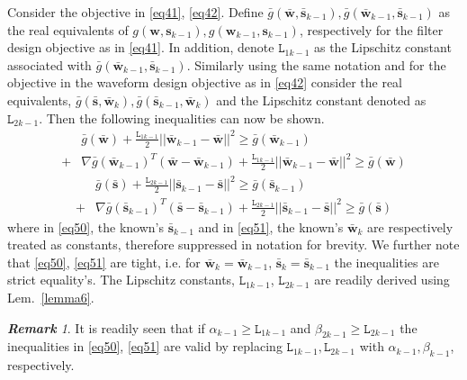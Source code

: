 \documentclass[11pt,draftclsnofoot,onecolumn]{IEEEtran}
\theoremstyle{definition}
\theoremstyle{remark}
\newtheorem{remk}{\bf Remark}
\begin{document}
Consider the objective in \eqref{eq41}, \eqref{eq42}. Define $\bar{g}( \mathbf{\bar{w}},\mathbf{\bar{s}}_{k-1}),\bar{g}(\mathbf{\bar{w}}_{k-1},\mathbf{\bar{s}}_{k-1})$ as the real equivalents of $g( \mathbf{w},\mathbf{s}_{k-1}),g (\mathbf{w}_{k-1},\mathbf{s}_{k-1})$, respectively for the filter design objective as in \eqref{eq41}. In addition, denote  $\mathtt{L}_{1k-1}$ as the Lipschitz constant associated with $\bar{g}(\bar{\mathbf{w}}_{k-1},\mathbf{\bar{s}}_{k-1})$. Similarly using the same notation and for the objective in the waveform design objective  as in \eqref{eq42} consider the real equivalents, $\bar{g}( \mathbf{\bar{s}},\mathbf{\bar{w}}_{k}),\bar{g}(\mathbf{\bar{s}}_{k-1},\mathbf{\bar{w}}_{k})$ and the Lipschitz constant denoted as $\mathtt{L}_{2k-1}$. Then the following inequalities can now be shown.
\begin{equation} \label{eq50}
\begin{aligned} &\bar{g}( \mathbf{\bar{w}})+\frac{\mathtt{L}_{1k-1}}{2}||\mathbf{\bar{w}}_{k-1}-\mathbf{\bar{w}} ||^2
  \geq \bar{g}(\mathbf{\bar{w}}_{k-1}) \\
  +&\nabla \bar{g}(\mathbf{\bar{w}}_{k-1})^T(\mathbf{\bar{w}}-\mathbf{\bar{w}}_{k-1}) 
  +\frac{\mathtt{L}_{1k-1}}{2}||\mathbf{\bar{w}}_{k-1}-\mathbf{\bar{w}}||^2 \geq \bar{g}(\mathbf{\bar{w}}) \end{aligned}
\end{equation}
\begin{equation} \label{eq51}
\begin{aligned} &\bar{g}( \mathbf{\bar{s}})+\frac{\mathtt{L}_{2k-1}}{2}||\mathbf{\bar{s}}_{k-1}-\mathbf{\bar{s}} ||^2
  \geq \bar{g}(\mathbf{\bar{s}}_{k-1}) \\
  +&\nabla \bar{g}(\mathbf{\bar{s}}_{k-1})^T(\mathbf{\bar{s}}-\mathbf{\bar{s}}_{k-1}) 
  +\frac{\mathtt{L}_{2k-1}}{2}||\mathbf{\bar{s}}_{k-1}-\mathbf{\bar{s}}||^2 \geq \bar{g}(\mathbf{\bar{s}}) \end{aligned}
\end{equation}
where in \eqref{eq50}, the known's $\mathbf{\bar{s}}_{k-1}$ and  in \eqref{eq51}, the known's $\mathbf{\bar{w}}_{k}$ are respectively treated as constants, therefore suppressed in notation  for brevity. We further note that \eqref{eq50}, \eqref{eq51} are tight, i.e.  for $\mathbf{\bar{w}}_{k}=\mathbf{\bar{w}}_{k-1}$,  $\mathbf{\bar{s}}_{k}=\mathbf{\bar{s}}_{k-1}$ the inequalities are strict equality's. The Lipschitz constants, $\mathtt{L}_{1k-1}$, $\mathtt{L}_{2k-1}$ are readily derived using Lem.~\ref{lemma6}.  
\begin{remk} \label{remark4}
It is readily seen that if $\alpha_{k-1}\geq \mathtt{L}_{1k-1}$ and $\beta_{2k-1}\geq \mathtt{L}_{2k-1}$ the inequalities in \eqref{eq50}, \eqref{eq51} are valid by replacing $\mathtt{L}_{1k-1},\mathtt{L}_{2k-1}$ with $\alpha_{k-1},\beta_{k-1}$, respectively.
\end{remk}
\end{document}
